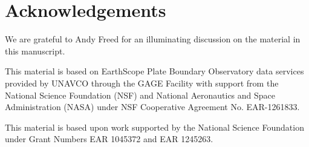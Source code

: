 \documentclass[1p]{elsarticle}
\begin{document}
\section*{Acknowledgements}
We are grateful to Andy Freed for an illuminating discussion on the material in this manuscript.  
 
This material is based on EarthScope Plate Boundary Observatory data services provided by UNAVCO through the GAGE Facility with support from the National Science Foundation (NSF) and National Aeronautics and Space Administration (NASA) under NSF Cooperative Agreement No. EAR-1261833.

This material is based upon work supported by the National Science
Foundation under Grant Numbers EAR 1045372 and EAR 1245263.








 


 

 
\end{document}

